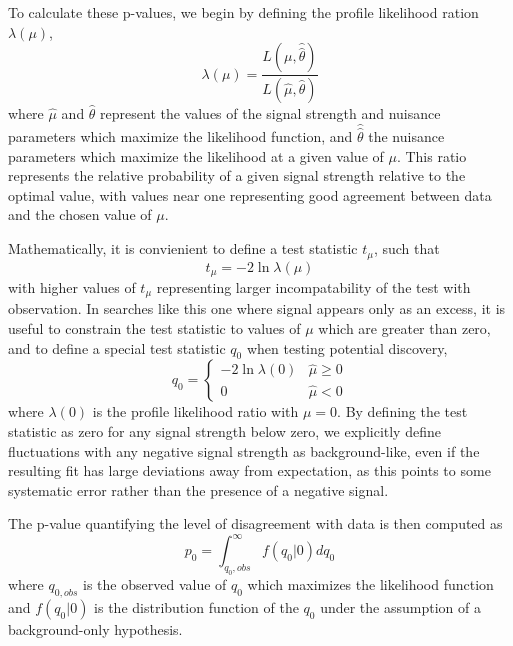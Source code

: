 To calculate these p-values, we begin by defining the profile likelihood ration $\lambda(\mu)$, 
\begin{equation}
   \lambda (\mu) = \frac{L(\mu, \hat{\hat{\theta}})}{L(\hat{\mu},\hat{\theta})}
\end{equation}
where $\hat{\mu}$ and $\hat{\theta}$ represent the values of the signal strength and nuisance parameters which maximize the likelihood function, and $\hat{\hat{\theta}}$ the nuisance parameters which maximize the likelihood at a given value of $\mu$. 
This ratio represents the relative probability of a given signal strength relative to the optimal value, with values near one representing good agreement between data and the chosen value of $\mu$. 

Mathematically, it is convienient to define a test statistic $t_\mu$, such that 
\begin{equation}
    t_\mu = -2 \ln \lambda (\mu)
\end{equation}
with higher values of $t_\mu$ representing larger incompatability of the test with observation. 
In searches like this one where signal appears only as an excess, it is useful to constrain the test statistic to values of $\mu$ which are greater than zero, and to define a special test statistic $q_0$ when testing potential discovery,
\begin{equation}
    q_0 = 
	\begin{cases} 
		-2 \ln \lambda(0) & \hat{\mu} \geq 0\\
                 0                & \hat{\mu} < 0 
        \end{cases}
\end{equation}
where $\lambda(0)$ is the profile likelihood ratio with $\mu=$0. 
By defining the test statistic as zero for any signal strength below zero, we explicitly define fluctuations with any negative signal strength as background-like, even if the resulting fit has large deviations away from expectation, as this points to some systematic error rather than the presence of a negative signal.

The p-value quantifying the level of disagreement with data is then computed as
\begin{equation}
	p_0 = \int_{q_0,obs}^{\infty} f(q_0|0) dq_0
\end{equation}
where $q_{0,obs}$ is the observed value of $q_0$ which maximizes the likelihood function and $f(q_0|0)$ is the distribution function of the $q_0$ under the assumption of a background-only hypothesis.

